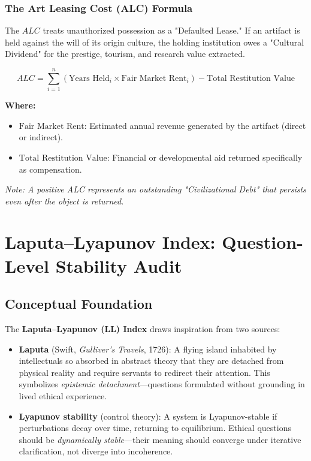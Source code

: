 \documentclass[11pt,a4paper]{article}
\theoremstyle{definition}
\theoremstyle{remark}
\begin{document}
\subsubsection*{The Art Leasing Cost (ALC) Formula}

The $ALC$ treats unauthorized possession as a "Defaulted Lease." If an artifact is held against the will of its origin culture, the holding institution owes a "Cultural Dividend" for the prestige, tourism, and research value extracted.

\begin{equation}
ALC = \sum_{i=1}^{n} \left( \text{Years Held}_i \times \text{Fair Market Rent}_i \right) - \text{Total Restitution Value}
\end{equation}

\textbf{Where:}
\begin{itemize}
    \item $\text{Fair Market Rent}$: Estimated annual revenue generated by the artifact (direct or indirect).
    \item $\text{Total Restitution Value}$: Financial or developmental aid returned specifically as compensation.
\end{itemize}

\textit{Note: A positive ALC represents an outstanding "Civilizational Debt" that persists even after the object is returned.}


\section{Laputa–Lyapunov Index: Question-Level Stability Audit}
\label{app:laputa-lyapunov}

\subsection{Conceptual Foundation}

The \textbf{Laputa–Lyapunov (LL) Index} draws inspiration from two sources:

\begin{itemize}
\item \textbf{Laputa} (Swift, \textit{Gulliver's Travels}, 1726): A flying island 
inhabited by intellectuals so absorbed in abstract theory that they are detached 
from physical reality and require servants to redirect their attention. This 
symbolizes \textit{epistemic detachment}—questions formulated without grounding 
in lived ethical experience.

\item \textbf{Lyapunov stability} (control theory): A system is Lyapunov-stable 
if perturbations decay over time, returning to equilibrium. Ethical questions 
should be \textit{dynamically stable}—their meaning should converge under 
iterative clarification, not diverge into incoherence.
\end{itemize}
\end{document}
